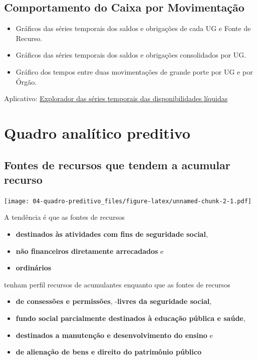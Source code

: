 \documentclass[]{book}
\providecommand{\tightlist}{%
  \setlength{\itemsep}{0pt}\setlength{\parskip}{0pt}}
\begin{document}
\hypertarget{comportamento-do-caixa-por-movimentacao}{%
\section{Comportamento do Caixa por Movimentação}\label{comportamento-do-caixa-por-movimentacao}}

\begin{itemize}
\tightlist
\item
  Gráficos das séries temporais dos saldos e obrigações de cada UG e Fonte de Recurso.
\item
  Gráficos das séries temporais dos saldos e obrigações consolidados por UG.
\item
  Gráfico dos tempos entre duas movimentações de grande porte por UG e por Órgão.
\end{itemize}

Aplicativo: \href{https://rseis.shinyapps.io/explorador_disponibilidades_liquidas}{Explorador das séries temporais das disponibilidades líquidas}

\hypertarget{quadro-analitico-preditivo}{%
\chapter{Quadro analítico preditivo}\label{quadro-analitico-preditivo}}

\hypertarget{fontes-de-recursos-que-tendem-a-acumular-recurso}{%
\section{Fontes de recursos que tendem a acumular recurso}\label{fontes-de-recursos-que-tendem-a-acumular-recurso}}

\texttt{[image: 04-quadro-preditivo\_files/figure-latex/unnamed-chunk-2-1.pdf]}

A tendência é que as fontes de recursos

\begin{itemize}
\tightlist
\item
  \textbf{destinados às atividades com fins de seguridade social},
\item
  \textbf{não financeiros diretamente arrecadados} e
\item
  \textbf{ordinários}
\end{itemize}

tenham perfil recursos de acumulantes enquanto que as fontes de recursos

\begin{itemize}
\tightlist
\item
  \textbf{de consessões e permissões},
  -\textbf{livres da seguridade social},
\item
  \textbf{fundo social parcialmente destinados à educação pública e saúde},
\item
  \textbf{destinados a manutenção e desenvolvimento do ensino} e
\item
  \textbf{de alienação de bens e direito do patrimônio público}
\end{itemize}
\end{document}
